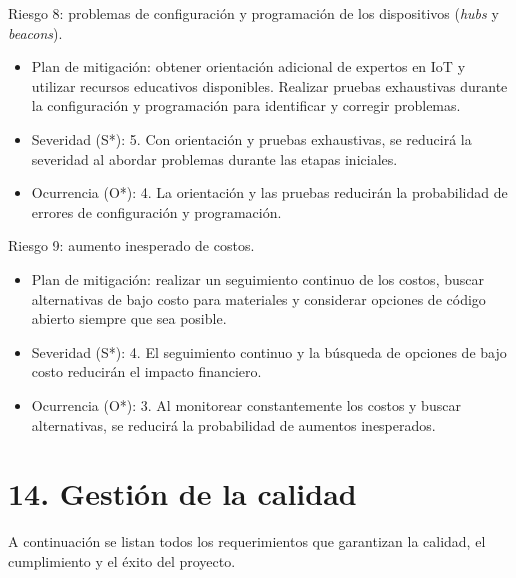 \documentclass[
11pt, %
]{charter}
\begin{document}
Riesgo 8: problemas de configuración y programación de los dispositivos (\textit{hubs} y \textit{beacons}).
\begin{itemize}
	\item Plan de mitigación: obtener orientación adicional de expertos en IoT y utilizar recursos educativos disponibles. Realizar pruebas exhaustivas durante la configuración y programación para identificar y corregir problemas.
	\item Severidad (S*): 5. Con orientación y pruebas exhaustivas, se reducirá la severidad al abordar problemas durante las etapas iniciales.
	\item Ocurrencia (O*): 4. La orientación y las pruebas reducirán la probabilidad de errores de configuración y programación.
\end{itemize}

Riesgo 9: aumento inesperado de costos.
\begin{itemize}
	\item Plan de mitigación: realizar un seguimiento continuo de los costos, buscar alternativas de bajo costo para materiales y considerar opciones de código abierto siempre que sea posible.
	\item Severidad (S*): 4. El seguimiento continuo y la búsqueda de opciones de bajo costo reducirán el impacto financiero.
	\item Ocurrencia (O*): 3. Al monitorear constantemente los costos y buscar alternativas, se reducirá la probabilidad de aumentos inesperados.
\end{itemize}


\section{14. Gestión de la calidad}
\label{sec:calidad}

A continuación se listan todos los requerimientos que garantizan la calidad, el cumplimiento y el éxito del proyecto.
\end{document}

